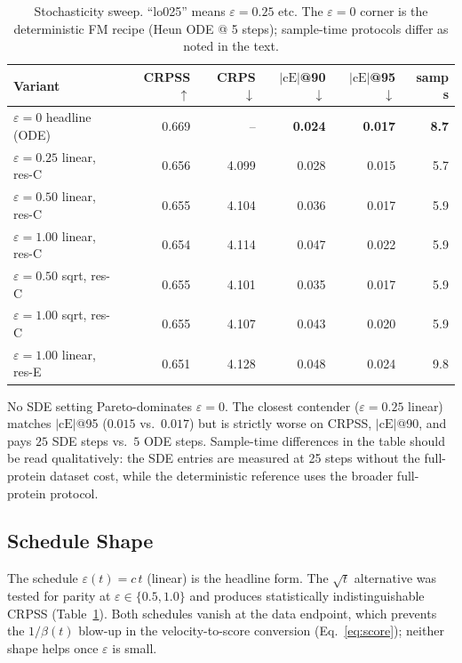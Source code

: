 \documentclass{tpm2026}
\begin{document}
\begin{table}[!h]
  \centering
  \caption{Stochasticity sweep. ``lo025'' means $\varepsilon=0.25$ etc. The $\varepsilon=0$ corner is the deterministic FM recipe (Heun ODE @ 5 steps); sample-time protocols differ as noted in the text.}\label{tab:stoch-eps}
  \footnotesize
  \begin{tabular}{lrrrrr}
    \toprule
    Variant & CRPSS $\uparrow$ & CRPS $\downarrow$ & $|\text{cE}|$@90 $\downarrow$ & $|\text{cE}|$@95 $\downarrow$ & samp s \\
    \midrule
    $\varepsilon=0$ headline (ODE)    & 0.669 & --     & \textbf{0.024} & \textbf{0.017} & \textbf{8.7} \\
    $\varepsilon=0.25$ linear, res-C  & 0.656 & 4.099  & 0.028 & 0.015 & 5.7 \\
    $\varepsilon=0.50$ linear, res-C  & 0.655 & 4.104  & 0.036 & 0.017 & 5.9 \\
    $\varepsilon=1.00$ linear, res-C  & 0.654 & 4.114  & 0.047 & 0.022 & 5.9 \\
    $\varepsilon=0.50$ sqrt, res-C    & 0.655 & 4.101  & 0.035 & 0.017 & 5.9 \\
    $\varepsilon=1.00$ sqrt, res-C    & 0.655 & 4.107  & 0.043 & 0.020 & 5.9 \\
    $\varepsilon=1.00$ linear, res-E  & 0.651 & 4.128  & 0.048 & 0.024 & 9.8 \\
    \bottomrule
  \end{tabular}
\end{table}

No SDE setting Pareto-dominates $\varepsilon=0$. The closest contender ($\varepsilon=0.25$ linear) matches $|\text{cE}|$@95 ($0.015$ vs.\ $0.017$) but is strictly worse on CRPSS, $|\text{cE}|$@90, and pays $25$ SDE steps vs.\ $5$ ODE steps. Sample-time differences in the table should be read qualitatively: the SDE entries are measured at 25 steps without the full-protein dataset cost, while the deterministic reference uses the broader full-protein protocol.

\subsection{Schedule Shape}\label{app:stoch-schedule}

The schedule $\varepsilon(t) = c\,t$ (linear) is the headline form. The $\sqrt{t}$ alternative was tested for parity at $\varepsilon \in \{0.5, 1.0\}$ and produces statistically indistinguishable CRPSS (Table~\ref{tab:stoch-eps}). Both schedules vanish at the data endpoint, which prevents the $1/\beta(t)$ blow-up in the velocity-to-score conversion (Eq.~\eqref{eq:score}); neither shape helps once $\varepsilon$ is small.
\end{document}
